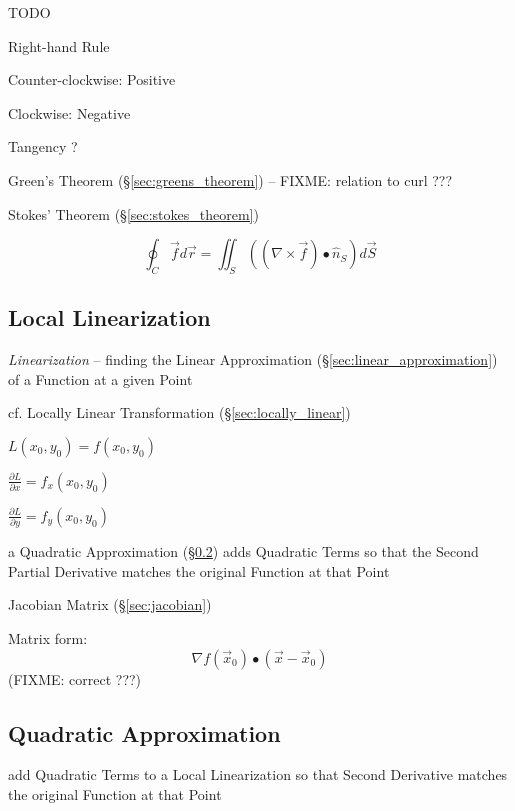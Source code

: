 TODO

Right-hand Rule

Counter-clockwise: Positive

Clockwise: Negative

Tangency ?

Green's Theorem (\S\ref{sec:greens_theorem}) -- FIXME: relation to curl ???

Stokes' Theorem (\S\ref{sec:stokes_theorem})

\[
  \oint_C \vec{f} d\vec{r}
    = \iint_S ((\nabla \times \vec{f}) \bullet \hat{n}_S) d\vec{S}
\]



\subsection{Local Linearization}\label{sec:linearization}

\emph{Linearization} -- finding the Linear Approximation
(\S\ref{sec:linear_approximation}) of a Function at a given Point

\fist cf. Locally Linear Transformation (\S\ref{sec:locally_linear})

$L(x_0,y_0) = f(x_0,y_0)$

$\frac{\partial{L}}{\partial{x}} = f_x(x_0,y_0)$

$\frac{\partial{L}}{\partial{y}} = f_y(x_0,y_0)$

a Quadratic Approximation (\S\ref{sec:quadratic_approximation}) adds Quadratic
Terms so that the Second Partial Derivative matches the original Function at
that Point

\fist Jacobian Matrix (\S\ref{sec:jacobian})

Matrix form:
\[
  \nabla f(\vec{x}_0) \bullet (\vec{x}-\vec{x}_0)
\]
(FIXME: correct ???)



\subsection{Quadratic Approximation}\label{sec:quadratic_approximation}

add Quadratic Terms to a Local Linearization so that Second Derivative matches
the original Function at that Point

